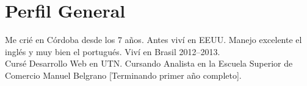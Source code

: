 \documentclass[a4paper, hidelinks]{twentysecondcv}
\begin{document}


\makeprofile %

\vfill 



\section{Perfil General} %

Me crié en Córdoba desde los 7 años. Antes viví en EEUU. 
Manejo excelente el inglés y muy bien el portugués. Viví en Brasil 2012–2013.\\
Cursé Desarrollo Web en UTN.
Cursando Analista en la Escuela Superior de Comercio Manuel Belgrano [Terminando primer año completo].


\end{document}
